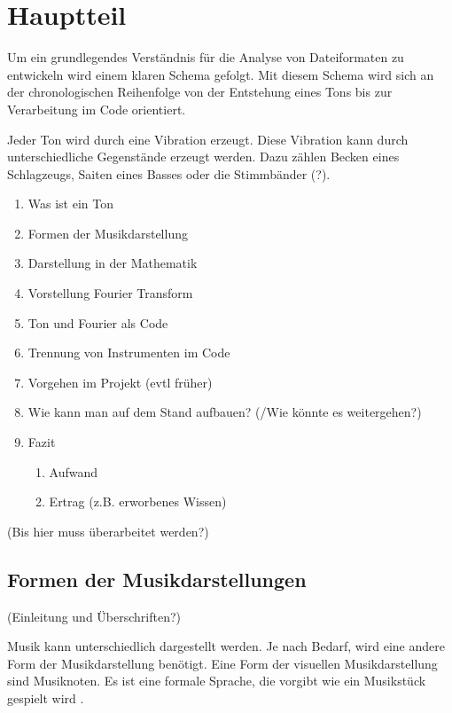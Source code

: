 \chapter{Hauptteil}
%


Um ein grundlegendes Verständnis für die Analyse von Dateiformaten zu entwickeln wird einem klaren Schema gefolgt. Mit diesem Schema wird sich an der chronologischen Reihenfolge von der Entstehung eines Tons bis zur Verarbeitung im Code orientiert.

\par

Jeder Ton wird durch eine Vibration erzeugt. Diese Vibration kann durch unterschiedliche Gegenstände erzeugt werden. Dazu zählen Becken eines Schlagzeugs, Saiten eines Basses oder die Stimmbänder (?).

%
\begin{enumerate}
    \item Was ist ein Ton
    \item Formen der Musikdarstellung
    \item Darstellung in der Mathematik
    \item Vorstellung Fourier Transform
    \item Ton und Fourier als Code
    \item Trennung von Instrumenten im Code
    \item Vorgehen im Projekt (evtl früher)
    \item Wie kann man auf dem Stand aufbauen? (/Wie könnte es weitergehen?)
    \item Fazit
    \begin{enumerate}
        \item Aufwand
        \item Ertrag (z.B. erworbenes Wissen)
    \end{enumerate}
\end{enumerate}
%

%
(Bis hier muss überarbeitet werden?)
%

%
\section{Formen der Musikdarstellungen}
%

%
(Einleitung und Überschriften?)
%

Musik kann unterschiedlich dargestellt werden. Je nach Bedarf, wird eine andere Form der Musikdarstellung benötigt. Eine Form der visuellen Musikdarstellung sind Musiknoten. Es ist eine formale Sprache, die vorgibt wie ein Musikstück gespielt wird \parencite{sheet_music_representations}.


